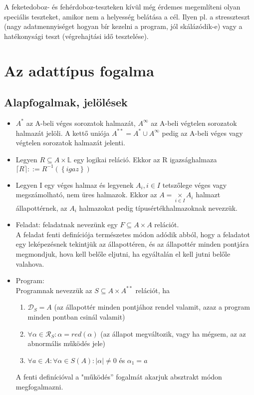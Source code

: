 \documentclass[margin=0px]{article}
\begin{document}
	 A feketedoboz- és fehérdoboz-teszteken kívül még érdemes megemlíteni olyan speciális teszteket, amikor nem a helyesség belátása a cél. Ilyen pl. a stresszteszt (nagy adatmennyiséget hogyan bír kezelni a program, jól skálázódik-e) vagy a hatékonysági teszt (végrehajtási idő tesztelése).
	 
	\section{Az adattípus fogalma}
	
	\subsection{Alapfogalmak, jelölések}
	
	\begin{itemize}
	
		\item	$A^{*}$ az A-beli véges sorozatok halmazát, $A^{\infty}$ az A-beli végtelen sorozatok halmazát jelöli.
		A kettő uniója $A^{**} = A^{*} \cup A^{\infty}$ pedig az A-beli véges vagy végtelen sorozatok halmazát jelenti.
	
		\item	Legyen $R \subseteq A \times \mathbb{L}$ egy logikai reláció. Ekkor az R igazsághalmaza
		$\lceil R \rceil ::= R^{-1}(\left\{{igaz}\right\}) $
		
		\item	Legyen I egy véges halmaz és legyenek $A_{i}, i \in I$ tetszőlege véges vagy megszámolható, nem üres halmazok.
		Ekkor az $A = \underset{i \in I}{\times} A_{i}$ halmazt állapottérnek, az $A_{i}$ halmazokat pedig típusértékhalmazoknak nevezzük.
		
		\item	Feladat: feladatnak nevezünk egy $F \subseteq A \times A$ relációt.\\
		A feladat fenti definíciója természetes módon adódik abból, hogy a feladatot egy
		leképezésnek tekintjük az állapottéren, és az állapottér minden pontjára megmondjuk,
		hova kell belőle eljutni, ha egyáltalán el kell jutni belőle valahova.
		
		\item Program:\\
		Programnak nevezzük az $S \subseteq A \times A^{**}$ relációt, ha
			\begin{enumerate}
				\item	$\mathcal{D}_{S}=A$ (az állapottér minden pontjához rendel valamit, azaz a program minden pontban csinál valamit)
				\item	$\forall \alpha \in \mathcal{R}_{S} : \alpha = red(\alpha)$ (az állapot megváltozik, vagy ha mégsem, az az abnormális működés jele)
				\item	$\forall a \in A : \forall \alpha \in S(A) : |\alpha| \not = 0$ és $\alpha_{1}=a$
			\end{enumerate}
		\noindent A fenti definícióval a "működés” fogalmát akarjuk absztrakt módon megfogalmazni.
		
	\end{itemize}
	
\end{document}
